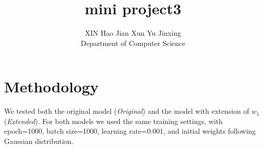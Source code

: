 \documentclass{article}
\title{mini project3}
\author{
  XIN Hao \quad Jian Xun \quad Yu Jinxing \\
  Department of Computer Science\\
}
\begin{document}

\maketitle



\section{Methodology}
We tested both the original model (\textit{Original}) and the model with extension of $w_1$ (\textit{Extended}). For both models we used the same training settings, with epoch=1000, batch size=1000, learning rate=0.001, and initial weights following Gaussian distribution.
%


\end{document}
